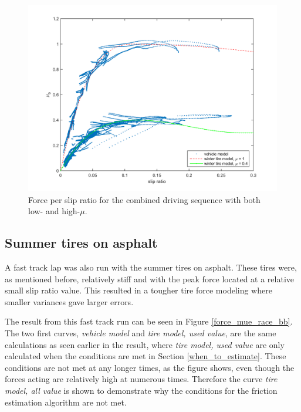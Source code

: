 \begin{figure}[h]
	\centering
	\includegraphics[width=1.0\textwidth]{Pictures/slip_kraft_comb2}
	\caption {Force per slip ratio for the combined driving sequence with both low- and high-$ \mu $.}
	\label{slip_kraft_comb2}
\end{figure}

\subsection{Summer tires on asphalt}
A fast track lap was also run with the summer tires on asphalt. These tires were, as mentioned before, relatively stiff and with the peak force located at a relative small slip ratio value. This resulted in a tougher tire force modeling where smaller variances gave larger errors. 

The result from this fast track run can be seen in Figure \ref{force_mue_race_bb}. The two first curves, \textit{vehicle model} and \textit{tire model, used value}, are the same calculations as seen earlier in the result, where \textit{tire model, used value} are only calculated when the conditions are met in Section \ref{when_to_estimate}. These conditions are not met at any longer times, as the figure shows, even though the forces acting are relatively high at numerous times. Therefore the curve  \textit{tire model, all value} is shown to demonstrate why the conditions for the friction estimation algorithm are not met.

